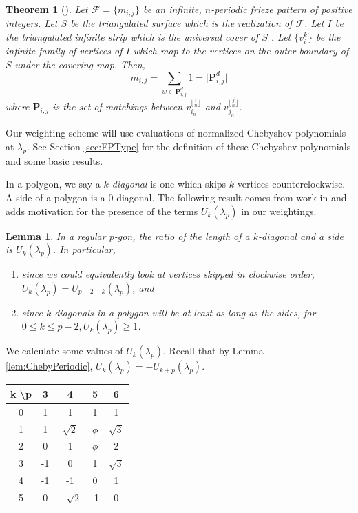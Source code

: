 \documentclass[12pt]{article}
\newtheorem{theorem}{Theorem}
\newtheorem{lemma}{Lemma}
\theoremstyle{remark}
\newcommand*{\pathset}[2]{\mathbf{P}_{#1,#2}}
\newcommand*{\F}{\mathcal{F}}
\begin{document}
\begin{theorem}[\cite{1}]\label{thm:BPTMatchings}
Let $\F = \{m_{i,j}\}$ be an infinite, $n$-periodic frieze pattern of positive integers. Let $S$ be the triangulated surface which is the realization of $\F$. Let $I$ be the triangulated infinite strip which is the universal cover of $S$ . Let $\{v_i^k\}$ be the infinite family of vertices of $I$ which map to the vertices on the outer boundary of $S$ under the covering map. Then,\[
m_{i,j} = \sum_{w \in \pathset{i}{j}^d} 1 = \vert  \pathset{i}{j}^d\vert
\]
where $\pathset{i}{j}$ is the set of matchings between $v_{i_n}^{\lfloor \frac{i}{n} \rfloor}$ and $v_{j_n}^{\lfloor \frac{j}{n} \rfloor}$.
\end{theorem}


Our weighting scheme will use evaluations of normalized Chebyshev polynomials at $\lambda_p$. See Section \ref{sec:FPType} for the definition of these Chebyshev polynomials and some basic results.

 In a polygon, we say a \emph{$k$-diagonal} is one which skips $k$ vertices counterclockwise. A side of a polygon is a 0-diagonal. The following result comes from work in \cite{15} and adds motivation for the presence of the terms $U_k(\lambda_p)$ in our weightings.

\begin{lemma}\label{lem:ChebyshevGeometric}
In a regular $p$-gon, the ratio of the length of a $k$-diagonal and a side is $U_k(\lambda_p)$. In particular,\begin{enumerate}
    \item since we could equivalently look at vertices skipped in clockwise order, $U_k(\lambda_p) = U_{p - 2 - k}(\lambda_p)$, and 
    \item since $k$-diagonals in a polygon will be at least as long as the sides, for $0 \leq k \leq p-2, U_k(\lambda_p) \geq 1$.
\end{enumerate}
\end{lemma}

We calculate some values of $U_k(\lambda_p)$. Recall that by Lemma \ref{lem:ChebyPeriodic}, $U_k(\lambda_p) = -U_{k+p}(\lambda_p)$.

\begin{center}
\begin{tabular}{c||c|c|c|c}
k \textbackslash p & 3 & 4 & 5 & 6\\\hline\hline
0 & 1 & 1 & 1 & 1\\
1 & 1 & $\sqrt{2}$& $\phi$ & $\sqrt{3}$\\
2 & 0 & 1 & $\phi$ & 2 \\
3 & -1 & 0 & 1 & $\sqrt{3}$\\
4 & -1 & -1 & 0 & 1 \\
5 & 0 & $-\sqrt{2}$ & -1 & 0\\ 
\end{tabular}
\end{center}
\end{document}
